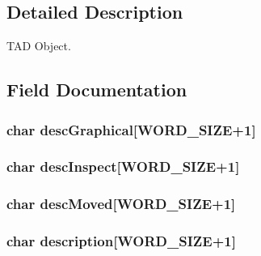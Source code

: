 \subsection{Detailed Description}
T\+A\+D Object. 


\begin{DoxyItemize}
\item 
\end{DoxyItemize}

\subsection{Field Documentation}
\hypertarget{struct___object_aeeb1a7cbcd065a4b3dd012ab2328718a}{
\subsubsection[{desc\+Graphical}]{\setlength{\rightskip}{0pt plus 5cm}char desc\+Graphical\mbox{[}{\bf W\+O\+R\+D\+\_\+\+S\+I\+Z\+E}+1\mbox{]}}}\label{struct___object_aeeb1a7cbcd065a4b3dd012ab2328718a}
\hypertarget{struct___object_a03234f00395c777593ac3f5b591b51ab}{
\subsubsection[{desc\+Inspect}]{\setlength{\rightskip}{0pt plus 5cm}char desc\+Inspect\mbox{[}{\bf W\+O\+R\+D\+\_\+\+S\+I\+Z\+E}+1\mbox{]}}}\label{struct___object_a03234f00395c777593ac3f5b591b51ab}
\hypertarget{struct___object_adf95ff7415d63695d1ff70ae6043747d}{
\subsubsection[{desc\+Moved}]{\setlength{\rightskip}{0pt plus 5cm}char desc\+Moved\mbox{[}{\bf W\+O\+R\+D\+\_\+\+S\+I\+Z\+E}+1\mbox{]}}}\label{struct___object_adf95ff7415d63695d1ff70ae6043747d}
\hypertarget{struct___object_a986940b5717dab72fc54860fd6e0d5fd}{
\subsubsection[{description}]{\setlength{\rightskip}{0pt plus 5cm}char description\mbox{[}{\bf W\+O\+R\+D\+\_\+\+S\+I\+Z\+E}+1\mbox{]}}}\label{struct___object_a986940b5717dab72fc54860fd6e0d5fd}
